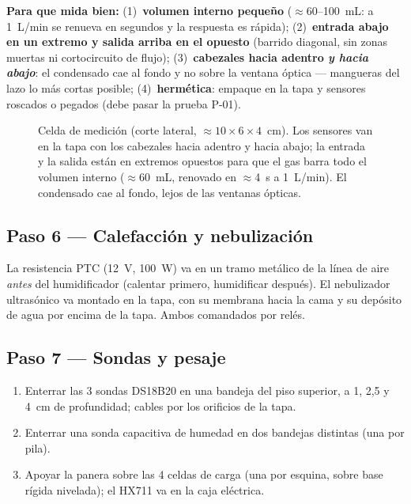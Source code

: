 \documentclass[11pt,a4paper]{article}
\newcommand{\paso}[1]{\subsection*{\large Paso #1}}
\begin{document}
\noindent\textbf{Para que mida bien:} (1)~\textbf{volumen interno pequeño}
(${\approx}$60--100~mL: a 1~L/min se renueva en segundos y la respuesta es
rápida); (2)~\textbf{entrada abajo en un extremo y salida arriba en el
opuesto} (barrido diagonal, sin zonas muertas ni cortocircuito de flujo);
(3)~\textbf{cabezales hacia adentro \emph{y hacia abajo}}: el condensado cae
al fondo y no sobre la ventana óptica --- mangueras del lazo lo más cortas
posible; (4)~\textbf{hermética}: empaque en la tapa y sensores roscados o
pegados (debe pasar la prueba P-01).

\begin{figure}[h!]
\centering
\resizebox{0.95\textwidth}{!}{}
\caption{Celda de medición (corte lateral, ${\approx}10\times6\times4$~cm).
Los sensores van en la tapa con los cabezales hacia adentro y hacia abajo;
la entrada y la salida están en extremos opuestos para que el gas barra todo
el volumen interno (${\approx}$60~mL, renovado en ${\approx}$4~s a
1~L/min). El condensado cae al fondo, lejos de las ventanas ópticas.}
\label{fig:celda}
\end{figure}

\paso{6 --- Calefacción y nebulización}
La resistencia PTC (12~V, 100~W) va en un tramo metálico de la línea de aire
\emph{antes} del humidificador (calentar primero, humidificar después). El
nebulizador ultrasónico va montado en la tapa, con su membrana hacia la cama y
su depósito de agua por encima de la tapa. Ambos comandados por relés.

\paso{7 --- Sondas y pesaje}
\begin{enumerate}
  \item Enterrar las 3 sondas DS18B20 en una bandeja del piso superior, a 1,
        2,5 y 4~cm de profundidad; cables por los orificios de la tapa.
  \item Enterrar una sonda capacitiva de humedad en dos bandejas distintas
        (una por pila).
  \item Apoyar la panera sobre las 4 celdas de carga (una por esquina, sobre
        base rígida nivelada); el HX711 va en la caja eléctrica.
\end{enumerate}
\end{document}
